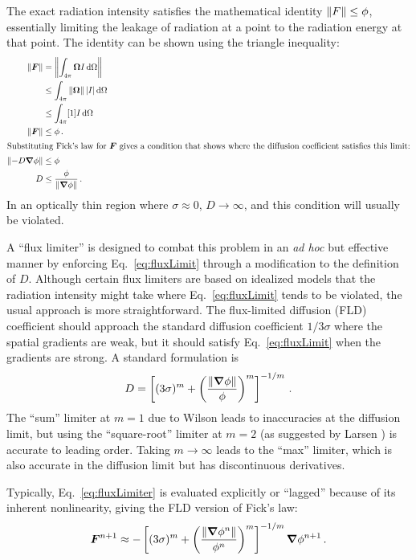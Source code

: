The exact radiation intensity satisfies the mathematical identity $\left\| F \right\| \le
\phi$,
essentially limiting the leakage of radiation at a point to the radiation
energy at that point. The identity can be shown using the triangle inequality:
\begin{align}
  \left\| \bm{F} \right\| &= \left\|  \int_{4\pi} \bm{\Omega} I \mathop{}\!\mathrm{d} \Omega \right\|
  \\ \nonumber
  &\le \int_{4\pi} \left\| \bm{\Omega} \right\| \left| I \right| \mathop{}\!\mathrm{d} \Omega 
  \\ \nonumber
  &\le \int_{4\pi} [1] I \mathop{}\!\mathrm{d}\Omega
  \\ \nonumber
  \left\| \bm{F} \right\| &\le \phi\,.
  \\ 
  \intertext{Substituting Fick's law for $\bm{F}$ gives a condition that
  shows where the
  diffusion coefficient satisfies this limit:} \nonumber
  \left\| - D \bm{\nabla} \phi \right\| &\le \phi
  \\ \label{eq:fluxLimit}
  D & \le \frac{\phi}{\left\| \bm{\nabla} \phi \right\|} \,.
\end{align}
In an optically thin region where $\sigma\approx 0$, $D\to\infty$, and this condition
will usually be violated.

A ``flux limiter'' is designed to combat this problem in an \emph{ad hoc} but
effective manner by enforcing Eq.~\eqref{eq:fluxLimit} through a modification to
the definition of $D$.
Although certain flux limiters \cite{Lev1984} are based on
idealized models that the radiation intensity might take where
Eq.~\eqref{eq:fluxLimit} tends to be violated, the usual approach is more
straightforward. The flux-limited diffusion (FLD) coefficient should approach the
standard diffusion coefficient $1/3\sigma$ where the spatial gradients are weak,
but it should satisfy Eq.~\eqref{eq:fluxLimit} when the gradients are strong.
A standard formulation \cite{Ols2000} is
\begin{equation} \label{eq:fluxLimiter}
  D = \left[ (3\sigma)^{m} + \left( \frac{\left\| \bm{\nabla}
  \phi \right\|}{\phi} \right)^{m}\right]^{-1/m} \,.
\end{equation}
The ``sum'' limiter at $m=1$ due to Wilson \cite{Mor2000} leads to inaccuracies
at the diffusion limit, but using the ``square-root'' limiter at $m=2$ (as
suggested by Larsen \cite{Ols2000}) is accurate to leading order. Taking
$m\to\infty$ leads to the ``max'' limiter, which is also accurate in the
diffusion limit but has discontinuous derivatives.

Typically, Eq.~\eqref{eq:fluxLimiter} is evaluated explicitly or ``lagged''
because of its inherent nonlinearity, giving the FLD version of Fick's law:
\begin{equation*}
  \bm{F}^{n+1} \approx - \left[ (3\sigma)^{m} + \left( \frac{\left\| \bm{\nabla}
  \phi^{n} \right\|}{\phi^{n}} \right)^{m}\right]^{-1/m} \bm{\nabla} \phi^{n+1} \,.
\end{equation*}


